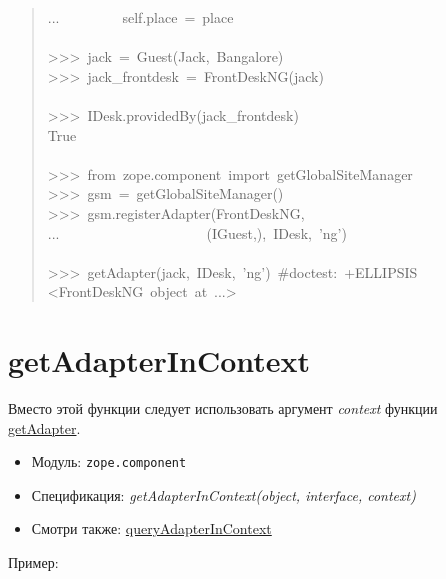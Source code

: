 \documentclass[a4paper,openany,twoside,final]{book}
\providecommand*{\DUroletitlereference}[1]{\textsl{#1}}
\begin{document}
\begin{quote}
{...~~~~~~~~~self.place~=~place\\
~\\
>{}>{}>~jack~=~Guest(\textquotedbl{}Jack\textquotedbl{},~\textquotedbl{}Bangalore\textquotedbl{})\\
>{}>{}>~jack\_frontdesk~=~FrontDeskNG(jack)\\
~\\
>{}>{}>~IDesk.providedBy(jack\_frontdesk)\\
True\\
~\\
>{}>{}>~from~zope.component~import~getGlobalSiteManager\\
>{}>{}>~gsm~=~getGlobalSiteManager()\\
>{}>{}>~gsm.registerAdapter(FrontDeskNG,\\
...~~~~~~~~~~~~~~~~~~~~~(IGuest,),~IDesk,~'ng')\\
~\\
>{}>{}>~getAdapter(jack,~IDesk,~'ng')~\#doctest:~+ELLIPSIS\\
<FrontDeskNG~object~at~...>
}
\end{quote}


\section*{getAdapterInContext%
  \label{getadapterincontext}%
}

Вместо этой функции следует использовать аргумент \DUroletitlereference{context} функции \hyperref[getadapter]{getAdapter}.

\begin{itemize}

\item Модуль: \texttt{zope.component}

\item Спецификация: \DUroletitlereference{getAdapterInContext(object, interface, context)}

\item Смотри также: \hyperref[queryadapterincontext]{queryAdapterInContext}

\end{itemize}

Пример:
\end{document}
